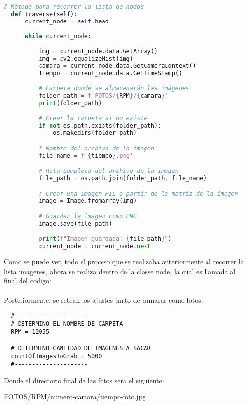 \documentclass{article}
\begin{document}
\begin{lstlisting}[language=Python]
  # Método para recorrer la lista de nodos
  def traverse(self):
      current_node = self.head
      
      while current_node:

          img = current_node.data.GetArray()
          img = cv2.equalizeHist(img)
          camara = current_node.data.GetCameraContext()
          tiempo = current_node.data.GetTimeStamp()

          # Carpeta donde se almacenarán las imágenes
          folder_path = f'FOTOS/{RPM}/{camara}'
          print(folder_path)

          # Crear la carpeta si no existe
          if not os.path.exists(folder_path):
              os.makedirs(folder_path)

          # Nombre del archivo de la imagen
          file_name = f'{tiempo}.png'

          # Ruta completa del archivo de la imagen
          file_path = os.path.join(folder_path, file_name)

          # Crear una imagen PIL a partir de la matriz de la imagen
          image = Image.fromarray(img)

          # Guardar la imagen como PNG
          image.save(file_path)

          print(f"Imagen guardada: {file_path}")
          current_node = current_node.next
\end{lstlisting}

\noindent Como se puede ver, todo el proceso que se realizaba anteriormente al recorrer la lista imagenes, ahora
se realiza dentro de la classe node, la cual es llamada al final del codigo:
\\ \\
Posteriormente, se setean los ajustes tanto de camaras como fotos:

\begin{lstlisting}
  #---------------------
  # DETERMINO EL NOMBRE DE CARPETA
  RPM = 12055

  # DETERMINO CANTIDAD DE IMAGENES A SACAR
  countOfImagesToGrab = 5000
  #---------------------
\end{lstlisting}

Donde el directorio final de las fotos sera el siguiente:

\begin{center}
  FOTOS/RPM/numero-camara/tiempo-foto.jpg
\end{center}
\end{document}
